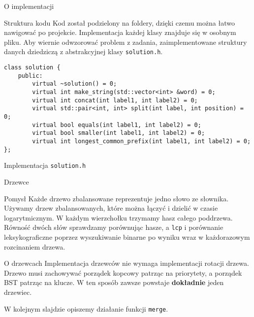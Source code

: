 \documentclass[polish]{beamer}
\begin{document}
\begin{frame}[fragile]{O implementacji}
    \begin{block}{Struktura kodu}
        Kod został podzielony na foldery, dzięki czemu można łatwo nawigować po projekcie. Implementacja każdej klasy znajduje się w osobnym pliku. Aby wiernie odwzorować problem z zadania, zaimplementowane struktury danych dziedziczą z abstrakcyjnej klasy \texttt{solution.h}.
    \end{block}
    \pause
    \begin{lrbox}{\thirdbox}
        \begin{lstlisting}[linewidth=18cm]
class solution {
    public:
        virtual ~solution() = 0;
        virtual int make_string(std::vector<int> &word) = 0;
        virtual int concat(int label1, int label2) = 0;
        virtual std::pair<int, int> split(int label, int position) = 0;
        virtual bool equals(int label1, int label2) = 0;
        virtual bool smaller(int label1, int label2) = 0;
        virtual int longest_common_prefix(int label1, int label2) = 0;
};
        \end{lstlisting}
    \end{lrbox}
    \begin{block}{Implementacja \texttt{solution.h}}
    \begin{center}
        \vskip 2mm
        \scalebox{0.6}{\usebox{\thirdbox}}
    \end{center}
    \end{block}
\end{frame}

\begin{frame}{Drzewce}
    \begin{block}{Pomysł}
        Każde drzewo zbalansowane reprezentuje jedno słowo ze słownika. Używamy drzew zbalansowanych, które można łączyć i dzielić w czasie logarytmicznym. W każdym wierzchołku trzymamy hasz całego poddrzewa. Równość dwóch słów sprawdzamy porównując hasze, a \texttt{lcp} i porównanie leksykograficzne poprzez wyszukiwanie binarne po wyniku wraz w każdorazowym rozcinaniem drzewa.
    \end{block}
    \pause
    \begin{block}{O drzewcach}
        Implementacja drzewców nie wymaga implementacji rotacji drzewa. Drzewo musi zachowywać porządek kopcowy patrząc na priorytety, a porządek BST patrząc na klucze. W ten sposób zawsze powstaje \textbf{dokładnie} jeden drzewiec.
    \end{block}
    \pause
    \begin{example}
        W kolejnym slajdzie opiszemy działanie funkcji \texttt{merge}.
    \end{example}
\end{frame}
\end{document}
